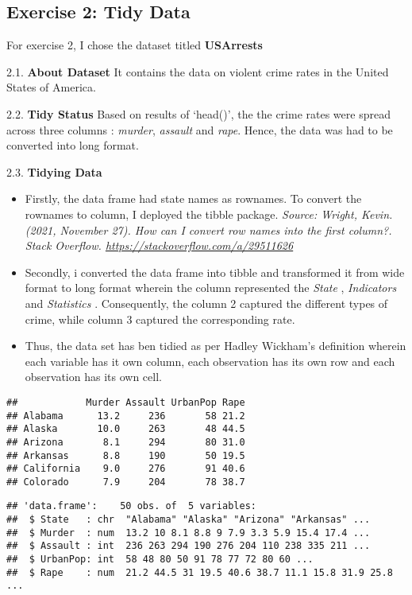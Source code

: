 \documentclass[
]{article}
\begin{document}
\hypertarget{exercise-2-tidy-data}{%
\subsection{\texorpdfstring{\textbf{Exercise 2: Tidy
Data}}{Exercise 2: Tidy Data}}\label{exercise-2-tidy-data}}

For exercise 2, I chose the dataset titled \textbf{USArrests}

2.1. \textbf{About Dataset} It contains the data on violent crime rates
in the United States of America.

2.2. \textbf{Tidy Status} Based on results of `head()', the the crime
rates were spread across three columns : \emph{murder}, \emph{assault}
and \emph{rape}. Hence, the data was had to be converted into long
format.

2.3. \textbf{Tidying Data}

\begin{itemize}
\item
  Firstly, the data frame had state names as rownames. To convert the
  rownames to column, I deployed the tibble package. \emph{Source:
  Wright, Kevin. (2021, November 27). How can I convert row names into
  the first column?. Stack Overflow.
  \url{https://stackoverflow.com/a/29511626} }
\item
  Secondly, i converted the data frame into tibble and transformed it
  from wide format to long format wherein the column represented the
  \emph{State} , \emph{Indicators} and \emph{Statistics} . Consequently,
  the column 2 captured the different types of crime, while column 3
  captured the corresponding rate.
\item
  Thus, the data set has ben tidied as per Hadley Wickham's definition
  wherein each variable has it own column, each observation has its own
  row and each observation has its own cell.
\end{itemize}

\begin{verbatim}
##            Murder Assault UrbanPop Rape
## Alabama      13.2     236       58 21.2
## Alaska       10.0     263       48 44.5
## Arizona       8.1     294       80 31.0
## Arkansas      8.8     190       50 19.5
## California    9.0     276       91 40.6
## Colorado      7.9     204       78 38.7
\end{verbatim}

\begin{verbatim}
## 'data.frame':    50 obs. of  5 variables:
##  $ State   : chr  "Alabama" "Alaska" "Arizona" "Arkansas" ...
##  $ Murder  : num  13.2 10 8.1 8.8 9 7.9 3.3 5.9 15.4 17.4 ...
##  $ Assault : int  236 263 294 190 276 204 110 238 335 211 ...
##  $ UrbanPop: int  58 48 80 50 91 78 77 72 80 60 ...
##  $ Rape    : num  21.2 44.5 31 19.5 40.6 38.7 11.1 15.8 31.9 25.8 ...
\end{verbatim}
\end{document}
